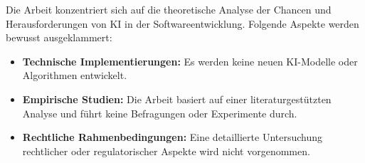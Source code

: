 Die Arbeit konzentriert sich auf die theoretische Analyse der Chancen und Herausforderungen von KI in der Softwareentwicklung. Folgende Aspekte werden bewusst ausgeklammert:

\begin{itemize}
    \item \textbf{Technische Implementierungen:} Es werden keine neuen KI-Modelle oder Algorithmen entwickelt.
    \item  \textbf{Empirische Studien:} Die Arbeit basiert auf einer literaturgestützten Analyse und führt keine Befragungen oder Experimente durch.
    \item \textbf{Rechtliche Rahmenbedingungen:} Eine detaillierte Untersuchung rechtlicher oder regulatorischer Aspekte wird nicht vorgenommen.
\end{itemize}
